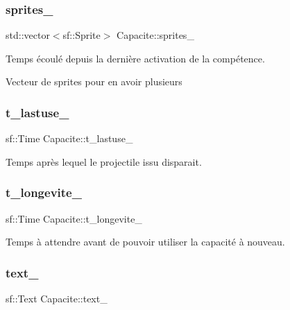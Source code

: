 \subsubsection{\texorpdfstring{sprites\+\_\+}{sprites\_}}
{\footnotesize\ttfamily std\+::vector$<$sf\+::\+Sprite$>$ Capacite\+::sprites\+\_\+\hspace{0.3cm}{\ttfamily [protected]}}



Temps écoulé depuis la dernière activation de la compétence. 

Vecteur de sprites pour en avoir plusieurs \mbox{\label{class_capacite_a0f1d7e4b84ef86c985401d9b12e1d4ca}} 
\subsubsection{\texorpdfstring{t\+\_\+lastuse\+\_\+}{t\_lastuse\_}}
{\footnotesize\ttfamily sf\+::\+Time Capacite\+::t\+\_\+lastuse\+\_\+\hspace{0.3cm}{\ttfamily [protected]}}



Temps après lequel le projectile issu disparait. 

\mbox{\label{class_capacite_a73a85c61740d7359eacfec10e152a268}} 
\subsubsection{\texorpdfstring{t\+\_\+longevite\+\_\+}{t\_longevite\_}}
{\footnotesize\ttfamily sf\+::\+Time Capacite\+::t\+\_\+longevite\+\_\+\hspace{0.3cm}{\ttfamily [protected]}}



Temps à attendre avant de pouvoir utiliser la capacité à nouveau. 

\mbox{\label{class_capacite_ad76ace2cf7ece150cd533bba193e262b}} 
\subsubsection{\texorpdfstring{text\+\_\+}{text\_}}
{\footnotesize\ttfamily sf\+::\+Text Capacite\+::text\+\_\+\hspace{0.3cm}{\ttfamily [protected]}}

